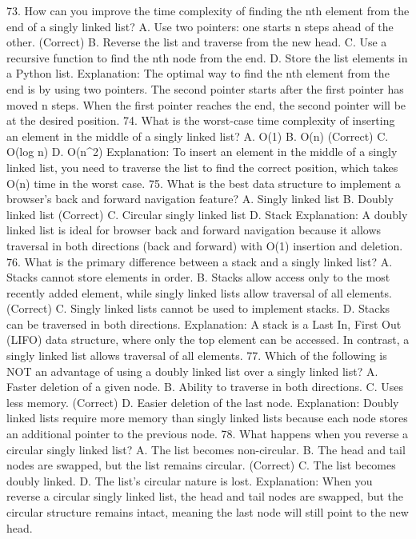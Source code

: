 73. How can you improve the time complexity of finding the nth element from the end of a singly linked list?
A. Use two pointers: one starts n steps ahead of the other. (Correct)
B. Reverse the list and traverse from the new head.
C. Use a recursive function to find the nth node from the end.
D. Store the list elements in a Python list.
Explanation: The optimal way to find the nth element from the end is by using two pointers. The second pointer starts after the first pointer has moved n steps. When the first pointer reaches the end, the second pointer will be at the desired position.
74. What is the worst-case time complexity of inserting an element in the middle of a singly linked list?
A. O(1)
B. O(n) (Correct)
C. O(log n)
D. O(n^2)
Explanation: To insert an element in the middle of a singly linked list, you need to traverse the list to find the correct position, which takes O(n) time in the worst case.
75. What is the best data structure to implement a browser’s back and forward navigation feature?
A. Singly linked list
B. Doubly linked list (Correct)
C. Circular singly linked list
D. Stack
Explanation: A doubly linked list is ideal for browser back and forward navigation because it allows traversal in both directions (back and forward) with O(1) insertion and deletion.
76. What is the primary difference between a stack and a singly linked list?
A. Stacks cannot store elements in order.
B. Stacks allow access only to the most recently added element, while singly linked lists allow traversal of all elements. (Correct)
C. Singly linked lists cannot be used to implement stacks.
D. Stacks can be traversed in both directions.
Explanation: A stack is a Last In, First Out (LIFO) data structure, where only the top element can be accessed. In contrast, a singly linked list allows traversal of all elements.
77. Which of the following is NOT an advantage of using a doubly linked list over a singly linked list?
A. Faster deletion of a given node.
B. Ability to traverse in both directions.
C. Uses less memory. (Correct)
D. Easier deletion of the last node.
Explanation: Doubly linked lists require more memory than singly linked lists because each node stores an additional pointer to the previous node.
78. What happens when you reverse a circular singly linked list?
A. The list becomes non-circular.
B. The head and tail nodes are swapped, but the list remains circular. (Correct)
C. The list becomes doubly linked.
D. The list's circular nature is lost.
Explanation: When you reverse a circular singly linked list, the head and tail nodes are swapped, but the circular structure remains intact, meaning the last node will still point to the new head.

